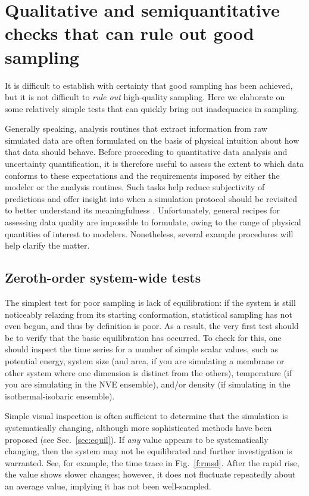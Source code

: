 
\section{Qualitative and semiquantitative checks that can rule out good sampling}
\label{sec:quick}

It is difficult to establish with certainty that good sampling has been achieved, but it is not difficult to \emph{rule out} high-quality sampling.
Here we elaborate on some relatively simple tests that can quickly bring out inadequacies in sampling.

Generally speaking, analysis routines that extract information from raw simulated data are often formulated on the basis of physical intuition about how that data should behave.  Before proceeding to quantitative data analysis and uncertainty quantification, it is therefore useful to assess the extent to which data conforms to these expectations and the requirements imposed by either the modeler or the analysis routines.  Such tasks help reduce subjectivity of predictions and offer insight into when a simulation protocol should be revisited to better understand its meaningfulness \cite{patrone1}.  Unfortunately, general recipes for assessing data quality are impossible to formulate, owing to the range of physical quantities of interest to modelers.  Nonetheless, several example procedures will help clarify the matter.

\subsection{Zeroth-order system-wide tests}
\label{sec:zeroth}

The simplest test for poor sampling is lack of equilibration: if the system is still noticeably relaxing from its starting conformation, statistical sampling has not even begun, and thus by definition is poor.  As a result, the very first test should be to verify that the basic equilibration has occurred.  To check for this, one should inspect the time series for a number of simple scalar values, such as potential energy, system size (and area, if you are simulating a membrane or other system where one dimension is distinct from the others), temperature (if you are simulating in the NVE ensemble), and/or density (if simulating in the isothermal-isobaric ensemble).

Simple visual inspection is often sufficient to determine that the simulation is systematically changing, although more sophisticated methods have been proposed (see Sec.\ \ref{sec:equil}).  If \emph{any} value appears to be systematically changing, %
then the system may not be equilibrated and further investigation is warranted.
See, for example, the time trace in Fig.\ \ref{f:rmsd}.
After the rapid rise, the value shows slower changes;
however, it does not fluctuate repeatedly about an average value, implying it has not been well-sampled.


